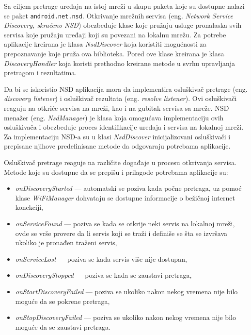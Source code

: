 \documentclass[struktura.tex]{subfiles}
\begin{document}
Sa ciljem pretrage uređaja na istoj mreži u skupu paketa koje su dostupne nalazi se paket  \verb|android.net.nsd|. Otkrivanje mrežnih servisa (eng. \textit{Network Service Discovery, skraćeno NSD}) \cite{sajt:nsd} obezbeđuje klase koje pružaju usluge pronalaska svih servisa koje pružaju uređaji koji su povezani na lokalnu mrežu. Za potrebe aplikacije kreirana je klasa \textit{NsdDiscover} koja koristiti mogućnosti za prepoznavanje koje pruža ova biblioteka. Pored ove klase kreirana je klasa \textit{DiscoveryHandler} koja koristi prethodno kreirane metode u svrhu upravljanja pretragom i rezultatima.

Da bi se iskoristio NSD aplikacija mora da implementira osluškivač pretrage (eng. \textit{discovery listener}) i osluškivač rezultata (eng. \textit{resolve listener}). Ovi osluškivači reaguju na otkriće servisa na mreži, kao i na gubitak servisa sa mreže. NSD menažer (eng. \textit{NsdManager}) je klasa koja omogućava implementaciju ovih osluškivača i obezbeđuje proces identifikacije uređaja i servisa na lokalnoj mreži. Za implementaciju NSD-a su u klasi \textit{NsdDiscover} inicijalizovani osluškivači i prepisane njihove predefinisane metode da odgovaraju potrebama aplikacije.

Osluškivač pretrage reaguje na različite događaje u procesu otkrivanja servisa. Metode koje su dostupne da se prepišu i prilagode potrebama aplikacije su:
\begin{itemize}
    \item \textit{onDiscoveryStarted} --- automatski se poziva kada počne pretraga, uz pomoć klase \textit{WiFiManager} dohvataju se dostupne informacije o bežičnoj internet konekciji,
    \item \textit{onServiceFound} --- poziva se kada se otkrije neki servis na lokalnoj mreži, ovde se vrše provere da li servis koji se traži i definiše se šta se izvršava ukoliko je pronađen traženi servis,
    \item \textit{onServiceLost} --- poziva se kada servis više nije dostupan,
    \item \textit{onDiscoveryStopped} --- poziva se kada se zaustavi pretraga, 
    \item \textit{onStartDiscoveryFailed} --- poziva se ukoliko nakon nekog vremena nije bilo moguće da se pokrene pretraga,
    \item \textit{onStopDiscoveryFailed} --- poziva se ukoliko nakon nekog vremena nije bilo moguće da se zaustavi pretraga.
\end{itemize}
\end{document}
